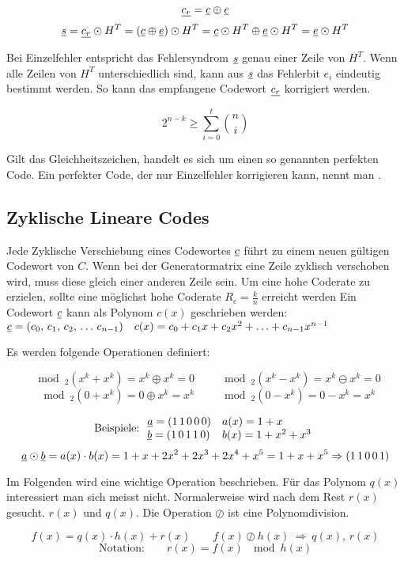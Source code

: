 \documentclass[a4paper]{article}
\begin{document}
\begin{twocolumn}
$$\underline{c_r} = \underline{c} \oplus \underline{e}$$ 
$$\underline{s} = \underline{c_r} \odot H^T = (\underline{c} \oplus \underline{e}) \odot H^T = \underline{c} \odot H^T \oplus \underline{e} \odot H^T = \underline{e} \odot H^T$$

Bei Einzelfehler entspricht das Fehlersyndrom $\underline{s}$ genau einer Zeile von $H^T$. 
Wenn alle Zeilen von $H^T$ unterschiedlich sind, kann aus $\underline{s}$ das Fehlerbit $e_i$ eindeutig bestimmt werden.
So kann das empfangene Codewort $\underline{c_r}$ korrigiert werden. 

$$2^{n-k} \geq \sum_{i=0}^t \binom{n}{i}$$

Gilt das Gleichheitszeichen, handelt es sich um einen so genannten perfekten Code. 
Ein perfekter Code, der nur Einzelfehler korrigieren kann, nennt man .

\subsection{Zyklische Lineare Codes}
Jede Zyklische Verschiebung eines Codewortes $\underline{c}$ führt zu einem neuen gültigen Codewort von $C$.
Wenn bei der Generatormatrix eine Zeile zyklisch verschoben wird, muss diese gleich einer anderen Zeile sein.
Um eine hohe Coderate zu erzielen, sollte eine möglichst hohe Coderate $R_c = \frac{k}{n}$ erreicht werden
Ein Codewort $\underline{c}$ kann als Polynom $c(x)$ geschrieben werden:
$\underline{c} = (c_0, \, c_1, \, c_2, \, \ldots \, c_{n-1}) \quad c(x) = c_0 + c_1 x + c_2 x^2 + \ldots + c_{n-1} x^{n-1}$

Es werden folgende Operationen definiert:

$$\mod_2(x^k + x^k) = x^k \oplus x^k = 0 \qquad \mod_2 (x^k - x^k) = x^k \ominus x^k = 0$$
$$\mod_2(0+x^k) = 0 \oplus x^k = x^k \qquad \mod_2(0-x^k) = 0 - x^k = x^k$$

$$\text{Beispiele:} \: 
\begin{array}{ll}
  \underline{a} = (1\,1\,0\,0\,0) & a(x) = 1 + x \\
  \underline{b} = (1\,0\,1\,1\,0) & b(x) = 1 + x^2 + x^3 \\
\end{array}$$
$$\underline{a} \odot \underline{b} = a(x) \cdot b(x) = 1 + x + 2x^2 + 2x^3 + 2x^4 + x^5 = 1 + x + x^5 \Rightarrow (1\,1\,0\,0\,1)$$

Im Folgenden wird eine wichtige Operation beschrieben. 
Für das Polynom $q(x)$ interessiert man sich meisst nicht.
Normalerweise wird nach dem Rest $r(x)$ gesucht. $r(x)$ und $q(x)$.
Die Operation $\oslash$ ist eine Polynomdivision.

$$f(x) = q(x) \cdot h(x) + r(x) \qquad f(x) \oslash h(x) \: \Rightarrow \: q(x), \, r(x) $$
$$\text{Notation:} \qquad r(x) = f(x) \: \mod h(x) $$


\end{twocolumn}
\end{document}
